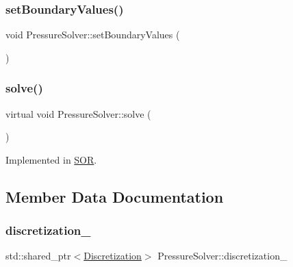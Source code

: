 \subsubsection{\texorpdfstring{setBoundaryValues()}{setBoundaryValues()}}
{\footnotesize\ttfamily void Pressure\+Solver\+::set\+Boundary\+Values (\begin{DoxyParamCaption}{ }\end{DoxyParamCaption})\hspace{0.3cm}{\ttfamily [protected]}}

\mbox{\label{classPressureSolver_a504ac61a1317650e0eb70d6a93212ca0}} 
\subsubsection{\texorpdfstring{solve()}{solve()}}
{\footnotesize\ttfamily virtual void Pressure\+Solver\+::solve (\begin{DoxyParamCaption}{ }\end{DoxyParamCaption})\hspace{0.3cm}{\ttfamily [pure virtual]}}



Implemented in \mbox{\hyperlink{classSOR_a860992d85d8aacf114a3a02b5831f728}{S\+OR}}.



\subsection{Member Data Documentation}
\mbox{\label{classPressureSolver_af579ecebaaa8b11914293ef18af5fdc6}} 
\subsubsection{\texorpdfstring{discretization\_}{discretization\_}}
{\footnotesize\ttfamily std\+::shared\+\_\+ptr$<$\mbox{\hyperlink{classDiscretization}{Discretization}}$>$ Pressure\+Solver\+::discretization\+\_\+\hspace{0.3cm}{\ttfamily [protected]}}

\mbox{\label{classPressureSolver_a22b723f3b3ba54e47f36cfc2b9576749}} 
